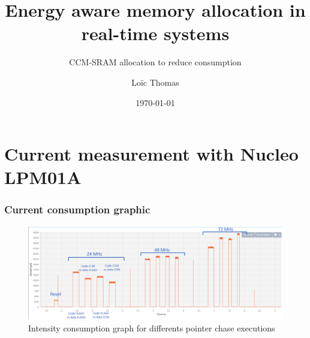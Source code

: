 \documentclass[
	11pt, %
]{beamer}
\title[Short Title]{Energy aware memory allocation in real-time systems} %
\subtitle{CCM-SRAM allocation to reduce consumption} %
\author[]{Loïc Thomas} %
\institute[UC]{LAAS CNRS \\ \smallskip \textit{lthomas@laas.fr}} %
\date[\today]{\today} %
\begin{document}

\begin{frame}
	\titlepage %
\end{frame}




\section{Current measurement with Nucleo LPM01A} %

\begin{frame}
	\frametitle{Current consumption graphic}
	\begin{figure}
		\centering
        \includegraphics[scale=0.6]{images/pointer_chase_capture_mod.png}
        \caption{Intensity consumption graph for differents pointer chase executions}
	\end{figure}
\end{frame}
\end{document}
